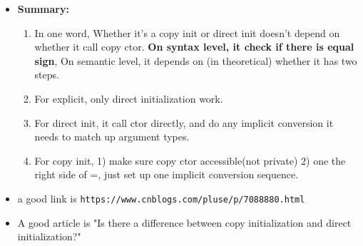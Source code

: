 \documentclass[a4paper,11pt,twoside]{book}
\begin{document}
\begin{itemize}
\item \textbf{Summary:}
\begin{enumerate}
	\item In one word, Whether it's a copy init or direct init doesn't depend on whether it call copy ctor. \textbf{On syntax level, it check if there is equal sign}, On semantic level,  it depends on (in theoretical) whether it has two steps.
	
	\item For explicit, only direct initialization work.  
	
	\item For direct init, it call ctor directly, and do any implicit conversion it needs to match up argument types.
	
	\item For copy init, 1) make sure copy ctor accessible(not private) 2) one the right side of =, just set up one implicit conversion sequence.
\end{enumerate}

		
\item a good link is \verb|https://www.cnblogs.com/pluse/p/7088880.html|
\item A good article is "Is there a difference between copy initialization and direct initialization?"

\end{itemize}
\end{document}
